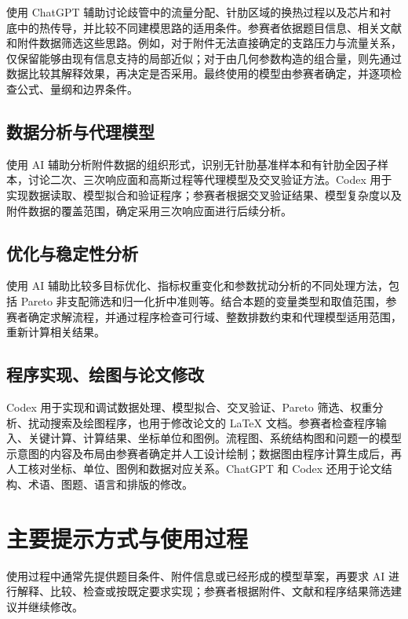 \documentclass[UTF8,a4paper,11pt]{ctexart}
\begin{document}
使用 ChatGPT 辅助讨论歧管中的流量分配、针肋区域的换热过程以及芯片和衬底中的热传导，并比较不同建模思路的适用条件。参赛者依据题目信息、相关文献和附件数据筛选这些思路。例如，对于附件无法直接确定的支路压力与流量关系，仅保留能够由现有信息支持的局部近似；对于由几何参数构造的组合量，则先通过数据比较其解释效果，再决定是否采用。最终使用的模型由参赛者确定，并逐项检查公式、量纲和边界条件。

\subsection{数据分析与代理模型}

使用 AI 辅助分析附件数据的组织形式，识别无针肋基准样本和有针肋全因子样本，讨论二次、三次响应面和高斯过程等代理模型及交叉验证方法。Codex 用于实现数据读取、模型拟合和验证程序；参赛者根据交叉验证结果、模型复杂度以及附件数据的覆盖范围，确定采用三次响应面进行后续分析。

\subsection{优化与稳定性分析}

使用 AI 辅助比较多目标优化、指标权重变化和参数扰动分析的不同处理方法，包括 Pareto 非支配筛选和归一化折中准则等。结合本题的变量类型和取值范围，参赛者确定求解流程，并通过程序检查可行域、整数排数约束和代理模型适用范围，重新计算相关结果。

\subsection{程序实现、绘图与论文修改}

Codex 用于实现和调试数据处理、模型拟合、交叉验证、Pareto 筛选、权重分析、扰动搜索及绘图程序，也用于修改论文的 \LaTeX{} 文档。参赛者检查程序输入、关键计算、计算结果、坐标单位和图例。流程图、系统结构图和问题一的模型示意图的内容及布局由参赛者确定并人工设计绘制；数据图由程序计算生成后，再人工核对坐标、单位、图例和数据对应关系。ChatGPT 和 Codex 还用于论文结构、术语、图题、语言和排版的修改。

\section{主要提示方式与使用过程}

使用过程中通常先提供题目条件、附件信息或已经形成的模型草案，再要求 AI 进行解释、比较、检查或按既定要求实现；参赛者根据附件、文献和程序结果筛选建议并继续修改。
\end{document}
